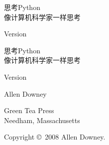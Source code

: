 




\newtheorem{ex}{Exercise}[chapter]
\begin{latexonly}

\renewcommand{\blankpage}{\thispagestyle{empty} \quad \newpage}


\thispagestyle{empty}
\begin{flushright}
\vspace*{2.0in}

\begin{spacing}{3}
{\huge 思考Python}\\
{\Large 像计算机科学家一样思考}
\end{spacing}

\vspace{0.25in}

Version \theversion

\vfill
\end{flushright}

\blankpage
\blankpage

\pagebreak
\thispagestyle{empty}

\begin{flushright}
\vspace*{2.0in}

\begin{spacing}{3}
{\huge 思考Python}\\
{\Large 像计算机科学家一样思考}
\end{spacing}

\vspace{0.25in}
Version \theversion

{\Large
	Allen Downey\\
}




\vspace{0.5in}

{\Large Green Tea Press}\\
{\small Needham, Massachusetts}

\vfill
\end{flushright}

\pagebreak
\thispagestyle{empty}

{\small
	Copyright \copyright ~2008 Allen Downey.

}
\end{latexonly}
